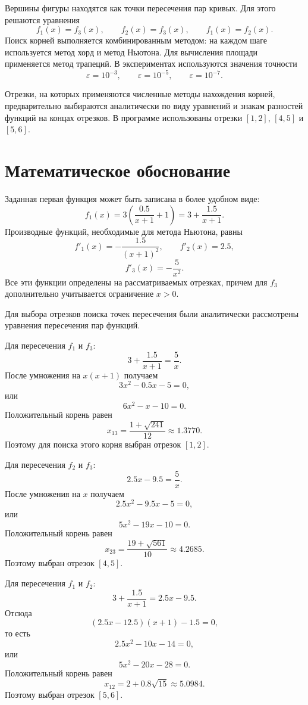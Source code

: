 \documentclass[a4paper,12pt,titlepage,finall]{article}
\begin{document}
Вершины фигуры находятся как точки пересечения пар кривых. Для этого решаются уравнения
\[
    f_1(x)=f_3(x),\qquad f_2(x)=f_3(x),\qquad f_1(x)=f_2(x).
\]
Поиск корней выполняется комбинированным методом: на каждом шаге используется метод хорд и метод Ньютона. Для вычисления площади применяется метод трапеций. В экспериментах используются значения точности
\[
    \varepsilon=10^{-3},\qquad \varepsilon=10^{-5},\qquad \varepsilon=10^{-7}.
\]

Отрезки, на которых применяются численные методы нахождения корней, предварительно выбираются аналитически по виду уравнений и знакам разностей функций на концах отрезков. В программе использованы отрезки \([1,2]\), \([4,5]\) и \([5,6]\).

\newpage

\section{Математическое обоснование}

Заданная первая функция может быть записана в более удобном виде:
\[
    f_1(x)=3\left(\frac{0.5}{x+1}+1\right)=3+\frac{1.5}{x+1}.
\]
Производные функций, необходимые для метода Ньютона, равны
\[
    f'_1(x)=-\frac{1.5}{(x+1)^2},\qquad
    f'_2(x)=2.5,
\]
\[
    f'_3(x)=-\frac{5}{x^2}.
\]
Все эти функции определены на рассматриваемых отрезках, причем для \(f_3\) дополнительно учитывается ограничение \(x>0\).

Для выбора отрезков поиска точек пересечения были аналитически рассмотрены уравнения пересечения пар функций.

Для пересечения \(f_1\) и \(f_3\):
\[
    3+\frac{1.5}{x+1}=\frac{5}{x}.
\]
После умножения на \(x(x+1)\) получаем
\[
    3x^2-0.5x-5=0,
\]
или
\[
    6x^2-x-10=0.
\]
Положительный корень равен
\[
    x_{13}=\frac{1+\sqrt{241}}{12}\approx 1.3770.
\]
Поэтому для поиска этого корня выбран отрезок \([1,2]\).

Для пересечения \(f_2\) и \(f_3\):
\[
    2.5x-9.5=\frac{5}{x}.
\]
После умножения на \(x\) получаем
\[
    2.5x^2-9.5x-5=0,
\]
или
\[
    5x^2-19x-10=0.
\]
Положительный корень равен
\[
    x_{23}=\frac{19+\sqrt{561}}{10}\approx 4.2685.
\]
Поэтому выбран отрезок \([4,5]\).

Для пересечения \(f_1\) и \(f_2\):
\[
    3+\frac{1.5}{x+1}=2.5x-9.5.
\]
Отсюда
\[
    (2.5x-12.5)(x+1)-1.5=0,
\]
то есть
\[
    2.5x^2-10x-14=0,
\]
или
\[
    5x^2-20x-28=0.
\]
Положительный корень равен
\[
    x_{12}=2+0.8\sqrt{15}\approx 5.0984.
\]
Поэтому выбран отрезок \([5,6]\).
\end{document}
